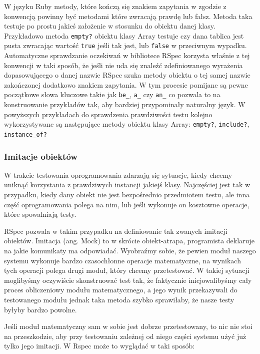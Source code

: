     W języku Ruby metody, które kończą się znakiem zapytania w zgodzie z konwencją powinny być metodami które zwracają prawdę lub fałsz. Metoda taka testuje po prostu jakieś założenie w stosunku do obiektu danej klasy. Przykładowo metoda \verb+empty?+ obiektu klasy Array testuje czy dana tablica jest pusta zwracając wartość \verb+true+ jeśli tak jest, lub \verb+false+ w przeciwnym wypadku. Automatyczne sprawdzanie oczekiwań w bibliotece RSpec korzysta właśnie z tej konwencji w taki sposób, że jeśli nie uda się znaleźć zdefiniowanego wyrażenia dopasowującego o danej nazwie RSpec szuka metody obiektu o tej samej nazwie zakończonej dodatkowo znakiem zapytania. W tym procesie pomijane są pewne początkowe słowa kluczowe takie jak \verb+be_+, \verb+a_+ czy \verb+an_+ co pozwala to na konstruowanie przykładów tak, aby bardziej przypominały naturalny język. W powyższych przykładach do sprawdzenia prawdziwości testu kolejno wykorzystywane są następujące metody obiektu klasy Array: \verb+empty?+, \verb+include?+, \verb+instance_of?+
    
    \subsubsection{Imitacje obiektów}
    W trakcie testowania oprogramowania zdarzają się sytuacje, kiedy chcemy uniknąć korzystania z prawdziwych instancji jakiejś klasy. Najczęściej jest tak w przypadku, kiedy dany obiekt nie jest bezpośrednio przedmiotem testu, ale inna część oprogramowania polega na nim, lub jeśli wykonuje on kosztowne operacje, które spowalniają testy.
    
    RSpec pozwala w takim przypadku na definiowanie tak zwanych imitacji obiektów. Imitacja (ang. Mock) to w skrócie obiekt-atrapa, programista deklaruje na jakie komunikaty ma odpowiadać. Wyobraźmy sobie, że pewien moduł naszego systemu wykonuje bardzo czasochłonne operacje matematyczne, na wynikach tych operacji polega drugi moduł, który chcemy przetestować. W takiej sytuacji moglibyśmy oczywiście skonstruować test tak, że faktycznie inicjowalibyśmy cały proces obliczeniowy modułu matematycznego, a jego wynik przekazywali do testowanego modułu jednak taka metoda szybko sprawiłaby, że nasze testy byłyby bardzo powolne. 
    
    Jeśli moduł matematyczny sam w sobie jest dobrze przetestowany, to nic nie stoi na przeszkodzie, aby przy testowaniu zależnej od niego części systemu użyć już tylko jego imitacji. W Rspec może to wyglądać w taki sposób:
    
